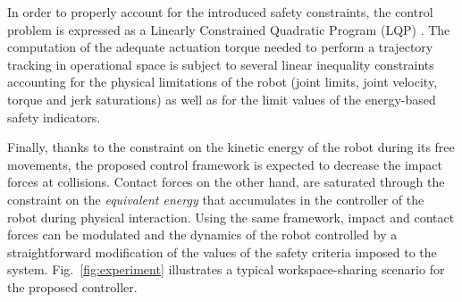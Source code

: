 
In order to properly account for the introduced safety constraints, the control problem is expressed as a Linearly Constrained Quadratic Program (LQP) \cite{boyd2004}. The computation of the adequate actuation torque needed to perform a trajectory tracking in operational space is subject to several linear inequality constraints accounting for the physical limitations of the robot (joint limits, joint velocity, torque and jerk saturations) as well as for the limit values of the energy-based safety indicators. 

Finally, thanks to the constraint on the kinetic energy of the robot during its free movements, the proposed control framework is expected to decrease the impact forces at collisions. Contact forces on the other hand, are saturated through the constraint on the \textit{equivalent energy} that accumulates in the controller of the robot during physical interaction. Using the same framework, impact and contact forces can be modulated and the dynamics of the robot  controlled by a straightforward modification of the values of the safety criteria imposed to the system. Fig.~\ref{fig:experiment} illustrates a typical workspace-sharing scenario for the proposed controller.

